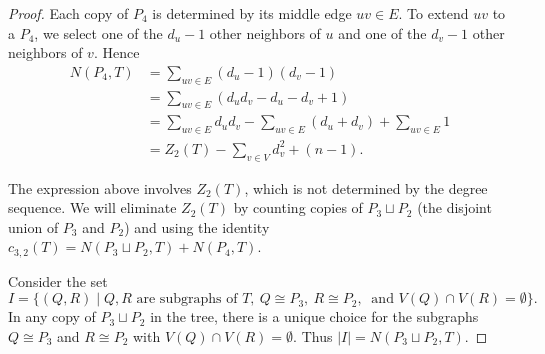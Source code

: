\documentclass[12pt,reqno]{amsart}
\theoremstyle{definition}
\begin{document}
\begin{proof}
Each copy of $P_4$ is determined by its middle edge $uv\in E$. To extend $uv$ to a $P_4$, we select one of the $d_u-1$ other neighbors of $u$ and one of the $d_v-1$ other neighbors of $v$. Hence
\begin{align*}
    N(P_4, T) &= \sum_{uv\in E} (d_u-1)(d_v-1) \\
    &= \sum_{uv\in E} (d_u d_v - d_u - d_v + 1) \\
    &=\sum_{uv\in E}d_ud_v -\sum_{uv\in E}(d_u+d_v)+\sum_{uv\in E}1\\
    &=Z_2(T) - \sum_{v\in V} d_v^2 + (n-1).
\end{align*}

The expression above involves $Z_2(T)$, which is not determined by the degree sequence. We will eliminate $Z_2(T)$ by counting copies of $P_3\sqcup P_2$ (the disjoint union of $P_3$ and $P_2$) and using the identity $c_{3, 2}(T)=N(P_3\sqcup P_2, T)+N(P_4,T)$.

Consider the set
\[
I = \{(Q, R) \mid Q, R \text{ are subgraphs of } T, \ Q\cong P_3,\ R\cong P_2,\ \text{ and } V(Q)\cap V(R)=\emptyset\}.
\]
In any copy of $P_3\sqcup P_2$ in the tree, there is a unique choice for the subgraphs $Q\cong P_3$ and $R\cong P_2$ with $V(Q)\cap V(R)=\emptyset$. Thus $|I|=N(P_3\sqcup P_2, T)$.


\end{proof}
\end{document}
